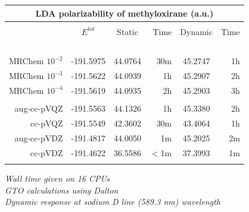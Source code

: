 \begin{frame}
\begin{table}
\begin{tabular}{r|c|cr|cr}
\multicolumn{6}{c}{\textbf{LDA polarizability of methyloxirane (a.u.)}}\\
\hline
\hline
	             &               &               &               &               &               \\
                     & $E^{tot}$     & Static        &Time           & Dynamic       &Time           \\
    \hspace{20mm}\   &\hspace{20mm}\ &\hspace{20mm}\ &\hspace{05mm}\ &\hspace{20mm}\ &\hspace{05mm}\ \\
    MRChem $10^{-2}$ & -191.5975     & 44.0764       &   30m         & 45.2747       &   1h          \\
    MRChem $10^{-3}$ & -191.5622     & 44.0939       &    1h         & 45.2907       &   2h          \\
    MRChem $10^{-4}$ & -191.5619     & 44.0935       &    2h         & 45.2903       &   3h          \\
	             &               &               &               &               &               \\
    aug-cc-pVQZ      & -191.5563     & 44.1326       &    1h         & 45.3380       &   2h          \\
	cc-pVQZ      & -191.5549     & 42.3602       &   30m         & 43.4064       &   1h          \\
    aug-cc-pVDZ      & -191.4817     & 44.0050       &    1m         & 45.2025       &   2m          \\
	cc-pVDZ      & -191.4622     & 36.5586       &    $<$1m      & 37.3993       &   1m          \\
	             &               &               &               &               &               \\
\hline
\hline
\end{tabular}
\end{table}

\centering
\it{Wall time given on 16 CPUs}\\
\it{GTO calculations using Dalton}\\
\it{Dynamic response at sodium D line (589.3 nm) wavelength}

\end{frame}


